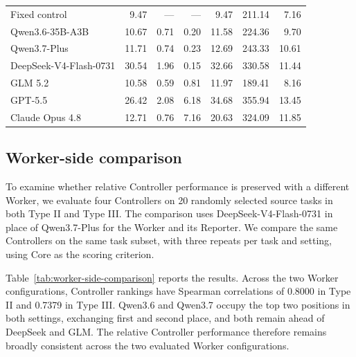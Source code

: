 \begin{table}[H]
\begin{tabular}{@{}lrrrrrr@{}}
\hspace{0.8em}Fixed control & 9.47 & --- & --- & 9.47 & 211.14 & 7.16 \\
\hspace{0.8em}Qwen3.6-35B-A3B & 10.67 & 0.71 & 0.20 & 11.58 & 224.36 & 9.70 \\
\hspace{0.8em}Qwen3.7-Plus & 11.71 & 0.74 & 0.23 & 12.69 & 243.33 & 10.61 \\
\hspace{0.8em}DeepSeek-V4-Flash-0731 & 30.54 & 1.96 & 0.15 & 32.66 & 330.58 & 11.44 \\
\hspace{0.8em}GLM 5.2 & 10.58 & 0.59 & 0.81 & 11.97 & 189.41 & 8.16 \\
\hspace{0.8em}GPT-5.5 & 26.42 & 2.08 & 6.18 & 34.68 & 355.94 & 13.45 \\
\hspace{0.8em}Claude Opus 4.8 & 12.71 & 0.76 & 7.16 & 20.63 & 324.09 & 11.85 \\
\bottomrule
\end{tabular}
\end{table}

\subsection{Worker-side comparison}
\label{app:worker-side-comparison}

To examine whether relative Controller performance is preserved with a different Worker, we evaluate four Controllers on 20 randomly selected source tasks in both Type II and Type III. The comparison uses DeepSeek-V4-Flash-0731 in place of Qwen3.7-Plus for the Worker and its Reporter. We compare the same Controllers on the same task subset, with three repeats per task and setting, using Core as the scoring criterion.

Table~\ref{tab:worker-side-comparison} reports the results. Across the two Worker configurations, Controller rankings have Spearman correlations of 0.8000 in Type II and 0.7379 in Type III. Qwen3.6 and Qwen3.7 occupy the top two positions in both settings, exchanging first and second place, and both remain ahead of DeepSeek and GLM. The relative Controller performance therefore remains broadly consistent across the two evaluated Worker configurations.

